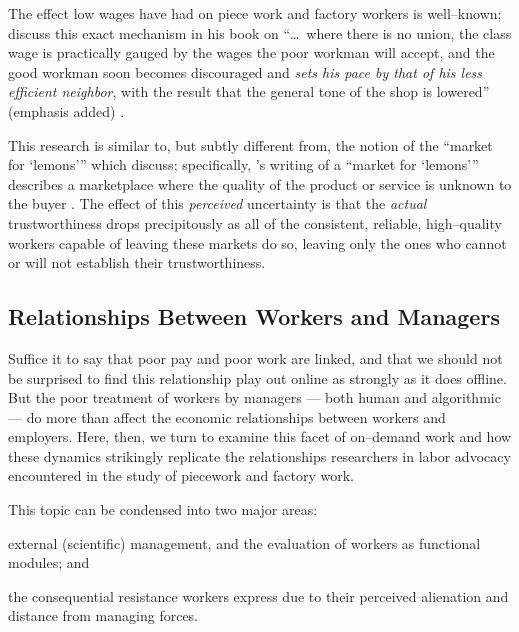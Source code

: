 \documentclass[trackingWork]{subfiles}
\begin{document}
{\begin{appendices}

    The effect low wages have had on piece work and factory workers is well--known;
    \citeauthor{gantt1913work} discuss this exact mechanism in his book on
    ``\dots~where there is no union,
    the class wage is practically gauged by the wages the poor workman will accept,
    and the good workman soon becomes discouraged and \textit{sets his pace by that of his less efficient neighbor},
    with the result that the general tone of the shop is lowered'' (emphasis added)
    \cite{gantt1913work}.

    This research is similar to, but subtly different from, the notion of the ``market for `lemons'''
    which \citeauthor{fort2011amazon} discuss;
    specifically, \citeauthor{akerlof1970market}'s writing of a ``market for `lemons'''
    describes a marketplace where the quality of the product or service is unknown to the buyer
    \cite{fort2011amazon,akerlof1970market}.
    The effect of this \textit{perceived} uncertainty is that
    the \textit{actual} trustworthiness drops precipitously
    as all of the consistent, reliable, high--quality workers capable of leaving these markets do so,
    leaving only the ones who cannot or will not establish their trustworthiness.

    \subsection{Relationships Between Workers and Managers}\label{sec:relationships}
    Suffice it to say that poor pay and poor work are linked,
    and that we should not be surprised to find this relationship play out online as strongly as it does offline.
    But the poor treatment of workers by managers
    --- both human and algorithmic ---
    do more than affect the economic relationships between workers and employers.
    Here, then, we turn to examine this facet of on--demand work
    and how these dynamics strikingly replicate the relationships
    researchers in labor advocacy encountered in the study of piecework and factory work.

    This topic can be condensed into two major areas:
    \begin{inlinelist}
    \item external (scientific) management, and the evaluation of workers as functional modules; and
    \item the consequential resistance workers express due to their perceived alienation and distance from managing forces.
    \end{inlinelist}


\end{appendices}}
\end{document}
